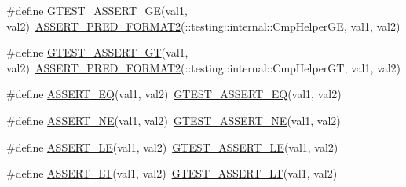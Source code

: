 \begin{DoxyCompactItemize}
\item 
\#define \mbox{\hyperlink{googletest-master_2googletest_2include_2gtest_2gtest_8h_a55373d99c079ff1b894e2eb5bcd15c5a}{G\+T\+E\+S\+T\+\_\+\+A\+S\+S\+E\+R\+T\+\_\+\+GE}}(val1,  val2)~\mbox{\hyperlink{_obj__test_2lib_2googletest-release-1_88_81_2googletest_2include_2gtest_2gtest__pred__impl_8h_ac452685a1a98ea3d96eb956a062ee210}{A\+S\+S\+E\+R\+T\+\_\+\+P\+R\+E\+D\+\_\+\+F\+O\+R\+M\+A\+T2}}(\+::testing\+::internal\+::\+Cmp\+Helper\+GE, val1, val2)
\item 
\#define \mbox{\hyperlink{googletest-master_2googletest_2include_2gtest_2gtest_8h_a088b9056fd1c1f316b41c22f64deb33a}{G\+T\+E\+S\+T\+\_\+\+A\+S\+S\+E\+R\+T\+\_\+\+GT}}(val1,  val2)~\mbox{\hyperlink{_obj__test_2lib_2googletest-release-1_88_81_2googletest_2include_2gtest_2gtest__pred__impl_8h_ac452685a1a98ea3d96eb956a062ee210}{A\+S\+S\+E\+R\+T\+\_\+\+P\+R\+E\+D\+\_\+\+F\+O\+R\+M\+A\+T2}}(\+::testing\+::internal\+::\+Cmp\+Helper\+GT, val1, val2)
\item 
\#define \mbox{\hyperlink{googletest-master_2googletest_2include_2gtest_2gtest_8h_a1a6db8b1338ee7040329322b77779086}{A\+S\+S\+E\+R\+T\+\_\+\+EQ}}(val1,  val2)~\mbox{\hyperlink{_obj__test_2lib_2googletest-release-1_88_81_2googletest_2include_2gtest_2gtest_8h_a8a7a47387090810cdfe78933d348182d}{G\+T\+E\+S\+T\+\_\+\+A\+S\+S\+E\+R\+T\+\_\+\+EQ}}(val1, val2)
\item 
\#define \mbox{\hyperlink{googletest-master_2googletest_2include_2gtest_2gtest_8h_aa866c8dece57912e6f51495ed3e8d8d5}{A\+S\+S\+E\+R\+T\+\_\+\+NE}}(val1,  val2)~\mbox{\hyperlink{_obj__test_2lib_2googletest-release-1_88_81_2googletest_2include_2gtest_2gtest_8h_a6fa9bb2b6731eba8f481e40e9e4931b3}{G\+T\+E\+S\+T\+\_\+\+A\+S\+S\+E\+R\+T\+\_\+\+NE}}(val1, val2)
\item 
\#define \mbox{\hyperlink{googletest-master_2googletest_2include_2gtest_2gtest_8h_a775643748feff0b490aae651d041e971}{A\+S\+S\+E\+R\+T\+\_\+\+LE}}(val1,  val2)~\mbox{\hyperlink{_obj__test_2lib_2googletest-release-1_88_81_2googletest_2include_2gtest_2gtest_8h_abef04dcd4a0259d378de7b3b3ffb6730}{G\+T\+E\+S\+T\+\_\+\+A\+S\+S\+E\+R\+T\+\_\+\+LE}}(val1, val2)
\item 
\#define \mbox{\hyperlink{googletest-master_2googletest_2include_2gtest_2gtest_8h_affc4f9cae4c3aabfe60fced83737b42c}{A\+S\+S\+E\+R\+T\+\_\+\+LT}}(val1,  val2)~\mbox{\hyperlink{_obj__test_2lib_2googletest-release-1_88_81_2googletest_2include_2gtest_2gtest_8h_a5a75667e637febd18e5f7d4f3abf55e8}{G\+T\+E\+S\+T\+\_\+\+A\+S\+S\+E\+R\+T\+\_\+\+LT}}(val1, val2)
\item 

\end{DoxyCompactItemize}
